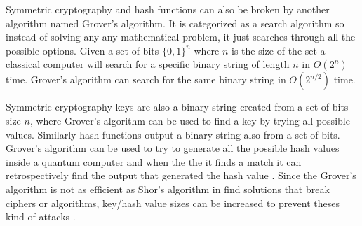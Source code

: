 Symmetric cryptography and hash functions can also be broken by another algorithm named Grover's algorithm. It is categorized as a search algorithm so instead of solving any any mathematical problem, it just searches through all the possible options. Given a set of bits $\{0, 1\}^n$ where $n$ is the size of the set a classical computer will search for a specific binary string of length $n$ in $O(2^n)$ time. Grover's algorithm can search for the same binary string in $O(2^{n/2})$ time. \cite{Yanofsky2008}

Symmetric cryptography keys are also a binary string created from a set of bits size $n$, where Grover's algorithm can be used to find a key by trying all possible values. Similarly hash functions output a binary string also from a set of bits. Grover's algorithm can be used to try to generate all the possible hash values inside a quantum computer and when the the it finds a match it can retrospectively find the output that generated the hash value \cite{Pretson2022}. Since the Grover's algorithm is not as efficient as Shor's algorithm in find solutions that break ciphers or algorithms, key/hash value sizes can be increased to prevent theses kind of attacks \cite{Chen2016}.
